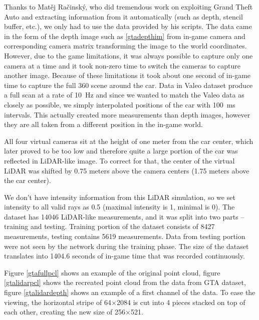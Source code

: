 Thanks to Matěj Račinský, who did tremendous work on exploiting Grand Theft Auto and extracting information from it automatically (such as depth, stencil buffer, etc.), we only had to use the data provided by his scripts. The data came in the form of the depth image such as \ref{gtadepthim} from in-game camera and corresponding camera matrix transforming the image to the world coordinates. However, due to the game limitations, it was always possible to capture only one camera at a time and it took non-zero time to switch the cameras to capture another image. Because of these limitations it took about one second of in-game time to capture the full 360\degree{} scene around the car. Data in Valeo dataset produce a full scan at a rate of 10~Hz and since we wanted to match the Valeo data as closely as possible, we simply interpolated positions of the car with 100~ms intervals. This actually created more measurements than depth images, however they are all taken from a different position in the in-game world.

All four virtual cameras sit at the height of one meter from the car center, which later proved to be too low and therefore quite a large portion of the car was reflected in LiDAR-like image. To correct for that, the center of the virtual LiDAR was shifted by 0.75 meters above the camera centers (1.75 meters above the car center).

We don't have intensity information from this LiDAR simulation, so we set intensity to all valid rays as 0.5 (maximal intensity is 1, minimal is 0). The dataset has 14046 LiDAR-like measurements, and it was split into two parts -- training and testing. Training portion of the dataset consists of 8427 measurements, testing contains 5619 measurements. Data from testing portion were not seen by the network during the training phase. The size of the dataset translates into 1404.6 seconds of in-game time that was recorded continuously.

Figure \ref{gtafullpcl} shows an example of the original point cloud, figure \ref{gtalidarpcl} shows the recreated point cloud from the data from GTA dataset, figure \ref{gtalidardepth} shows an example of a first channel of the data. To ease the viewing, the horizontal stripe of 64$\times$2084 is cut into 4 pieces stacked on top of each other, creating the new size of 256$\times$521.


